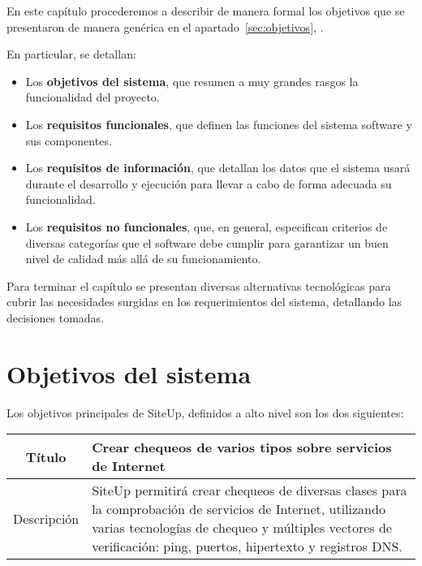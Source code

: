 
En este capítulo procederemos a describir de manera formal los objetivos que se
presentaron de manera genérica en el apartado~\ref{sec:objetivos},
\textit{}. 

En particular, se detallan:

\begin{itemize}
\item Los \textbf{objetivos del sistema}, que resumen a muy grandes rasgos la
  funcionalidad del proyecto.
\item Los \textbf{requisitos funcionales}, que definen las funciones del sistema
  software y sus componentes.
\item Los \textbf{requisitos de información}, que detallan los datos que el
  sistema usará durante el desarrollo y ejecución para llevar a cabo de forma
  adecuada su funcionalidad.
\item Los \textbf{requisitos no funcionales}, que, en general, especifican
  criterios de diversas categorías que el software debe cumplir para garantizar
  un buen nivel de calidad más allá de su funcionamiento.
\end{itemize}

Para terminar el capítulo se presentan diversas alternativas tecnológicas para
cubrir las necesidades surgidas en los requerimientos del sistema, detallando
las decisiones tomadas.


\section{Objetivos del sistema}

\renewcommand{\arraystretch}{1.5}

Los objetivos principales de SiteUp, definidos a alto nivel son los dos siguientes:

\begin{center}
  
  \begin{tabularx}{\textwidth}{|c|X|}
    \hline
    Título & Crear chequeos de varios tipos sobre servicios de Internet \\

    \hline

    Descripción & SiteUp permitirá crear chequeos de diversas clases para la
    comprobación de servicios de Internet, utilizando varias tecnologías de
    chequeo y múltiples vectores de verificación: ping, puertos, hipertexto y
    registros DNS. \\    

    \hline
  \end{tabularx}
\end{center}


